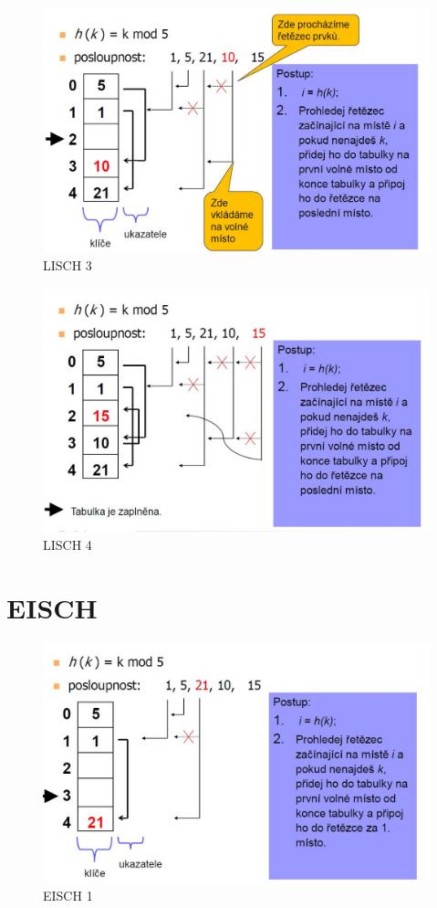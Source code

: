 \documentclass{book}
\begin{document}
\begin{figure}[h]
\begin{center}
\includegraphics[width=12cm]{LISCH3.jpg}
\caption{LISCH 3}
\label{fig:lisch3}
\end{center}
\end{figure}

\begin{figure}[h]
\begin{center}
\includegraphics[width=12cm]{LISCH4.jpg}
\caption{LISCH 4}
\label{fig:lisch4}
\end{center}
\end{figure}

\section{EISCH}

\begin{figure}[h]
\begin{center}
\includegraphics[width=12cm]{EISCH1.jpg}
\caption{EISCH 1}
\label{fig:eisch1}
\end{center}
\end{figure}
\end{document}
